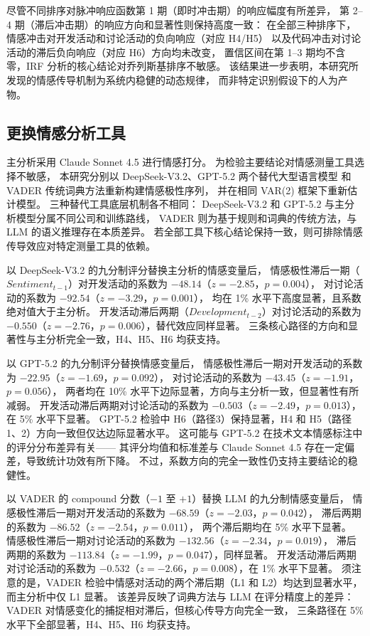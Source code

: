 \documentclass[
    type = master, %
    degree = professional,        %
    decl-page,  %
    twoside,                %
    fontset = fandol %
  ]{njuthesis}
\begin{document}
尽管不同排序对脉冲响应函数第 1 期（即时冲击期）的响应幅度有所差异，
第 2--4 期（滞后冲击期）的响应方向和显著性则保持高度一致：
在全部三种排序下，情感冲击对开发活动和讨论活动的负向响应（对应 H4/H5）
以及代码冲击对讨论活动的滞后负向响应（对应 H6）方向均未改变，
置信区间在第 1--3 期均不含零，IRF 分析的核心结论对乔列斯基排序不敏感。
该结果进一步表明，本研究所发现的情感传导机制为系统内稳健的动态规律，
而非特定识别假设下的人为产物。

\subsection{更换情感分析工具}

主分析采用 Claude Sonnet 4.5 进行情感打分。
为检验主要结论对情感测量工具选择不敏感，
本研究分别以 DeepSeek-V3.2、GPT-5.2 两个替代大型语言模型
和 VADER 传统词典方法\cite{hutto2014vader}重新构建情感极性序列，
并在相同 VAR(2) 框架下重新估计模型。
三种替代工具底层机制各不相同：
DeepSeek-V3.2 和 GPT-5.2 与主分析模型分属不同公司和训练路线，
VADER 则为基于规则和词典的传统方法，与 LLM 的语义推理存在本质差异。
若全部工具下核心结论保持一致，则可排除情感传导效应对特定测量工具的依赖。

以 DeepSeek-V3.2 的九分制评分替换主分析的情感变量后，
情感极性滞后一期（$Sentiment_{t-1}$）对开发活动的系数为
$-48.14$（$z = -2.85$，$p = 0.004$），
对讨论活动的系数为 $-92.54$（$z = -3.29$，$p = 0.001$），
均在 1\% 水平下高度显著，且系数绝对值大于主分析。
开发活动滞后两期（$Development_{t-2}$）对讨论活动的系数为
$-0.550$（$z = -2.76$，$p = 0.006$），替代效应同样显著。
三条核心路径的方向和显著性与主分析完全一致，H4、H5、H6 均获支持。

以 GPT-5.2 的九分制评分替换情感变量后，
情感极性滞后一期对开发活动的系数为
$-22.95$（$z = -1.69$，$p = 0.092$），
对讨论活动的系数为 $-43.45$（$z = -1.91$，$p = 0.056$），
两者均在 10\% 水平下边际显著，方向与主分析一致，但显著性有所减弱。
开发活动滞后两期对讨论活动的系数为
$-0.503$（$z = -2.49$，$p = 0.013$），在 5\% 水平下显著。
GPT-5.2 检验中 H6（路径3）保持显著，H4 和 H5（路径1、2）方向一致但仅达边际显著水平。
这可能与 GPT-5.2 在技术文本情感标注中的评分分布差异有关——
其评分均值和标准差与 Claude Sonnet 4.5 存在一定偏差，导致统计功效有所下降。
不过，系数方向的完全一致性仍支持主要结论的稳健性。

以 VADER 的 compound 分数（$-1$ 至 $+1$）替换 LLM 的九分制情感变量后，
情感极性滞后一期对开发活动的系数为
$-68.59$（$z = -2.03$，$p = 0.042$），
滞后两期的系数为 $-86.52$（$z = -2.54$，$p = 0.011$），
两个滞后期均在 5\% 水平下显著。
情感极性滞后一期对讨论活动的系数为
$-132.56$（$z = -2.34$，$p = 0.019$），
滞后两期的系数为 $-113.84$（$z = -1.99$，$p = 0.047$），同样显著。
开发活动滞后两期对讨论活动的系数为
$-0.532$（$z = -2.66$，$p = 0.008$），在 1\% 水平下显著。
须注意的是，VADER 检验中情感对活动的两个滞后期（L1 和 L2）均达到显著水平，
而主分析中仅 L1 显著。
该差异反映了词典方法与 LLM 在评分精度上的差异：
VADER 对情感变化的捕捉相对滞后，但核心传导方向完全一致，
三条路径在 5\% 水平下全部显著，H4、H5、H6 均获支持。
\end{document}
